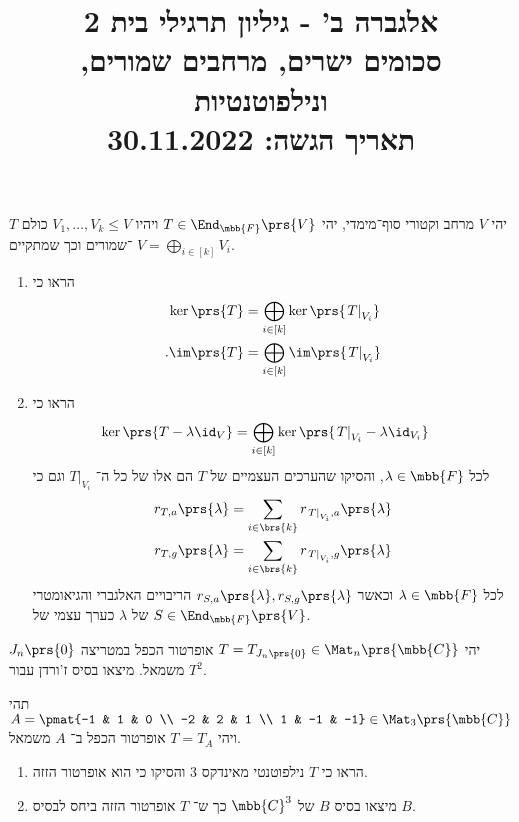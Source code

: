 \documentclass[a4paper,10pt,twoside,openany]{article}
\title{
אלגברה ב' - גיליון תרגילי בית 2 \\
סכומים ישרים, מרחבים שמורים, ונילפוטנטיות
\\
\vspace{1cm}
\large{תאריך הגשה: 30.11.2022}
}
\date{}
\begin{document}
\maketitle

\begin{exercise}
יהי
$V$
מרחב וקטורי סוף־מימדי, יהי
$T \in \End_{\mbb{F}}\prs{V}$
ויהיו
$V_1, \ldots, V_k \leq V$
כולם
$T$%
־שמורים וכך שמתקיים
$V = \bigoplus_{i \in [k]} V_i$.

\begin{enumerate}
\item 
הראו כי
\begin{align*}
\ker\prs{T} &= \bigoplus_{i \in [k]} \ker\prs{\left. T \right|_{V_i}} \\
\text{.} \im\prs{T} &= \bigoplus_{i \in [k]} \im\prs{\left. T \right|_{V_i}}
\end{align*}

\item
הראו כי
\begin{align*}
\ker\prs{T - \lambda \id_V} &= \bigoplus_{i \in [k]} \ker\prs{\left. T \right|_{V_i} - \lambda \id_{V_i}}
\end{align*}
לכל
$\lambda \in \mbb{F}$,
והסיקו שהערכים העצמיים של
$T$
הם אלו של כל ה־%
$\left. T \right|_{V_i}$
וגם כי
\begin{align*}
r_{T,a}\prs{\lambda} &= \sum_{i \in \brs{k}} r_{\left. T \right|_{V_i}, a}\prs{\lambda} \\
r_{T,g}\prs{\lambda} &= \sum_{i \in \brs{k}} r_{\left. T \right|_{V_i}, g}\prs{\lambda}
\end{align*}
לכל
$\lambda \in \mbb{F}$
וכאשר
$r_{S,a}\prs{\lambda}, r_{S,g}\prs{\lambda}$
הריבויים האלגברי והגיאומטרי של
$\lambda$
כערך עצמי של
$S \in \End_{\mbb{F}}\prs{V}$.
\end{enumerate}
\end{exercise}

\begin{exercise}
יהי
$T = T_{J_n\prs{0}} \in \Mat_n\prs{\mbb{C}}$
אופרטור הכפל במטריצה
$J_n\prs{0}$
משמאל.
מיצאו בסיס ז'ורדן עבור
$T^2$.
\end{exercise}

\begin{exercise}
תהי
$A = \pmat{-1 & 1 & 0 \\ -2 & 2 & 1 \\ 1 & -1 & -1} \in \Mat_3\prs{\mbb{C}}$
ויהי
$T = T_A$
אופרטור הכפל ב־%
$A$
משמאל.

\begin{enumerate}
\item הראו כי
$T$
נילפוטנטי מאינדקס
$3$
והסיקו כי הוא אופרטור הזזה.

\item
מיצאו בסיס
$B$
של
$\mbb{C}^3$
כך ש־%
$T$
אופרטור הזזה ביחס לבסיס
$B$.
\end{enumerate}
\end{exercise}
\end{document}
